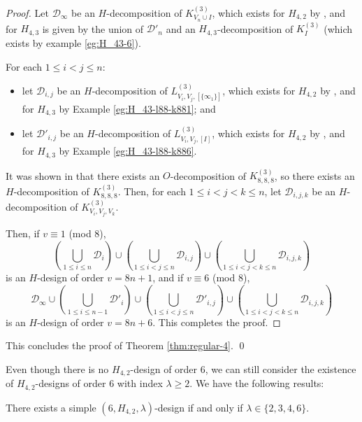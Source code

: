 \begin{proof}
Let $\mathcal{D}_\infty$ be an $H$-decomposition of $K_{V_n \cup I}^{(3)}$,
  which exists for $H_{4,2}$ by \cite{bryant}, and for $H_{4,3}$ is given by
  the union of $\mathcal{D}'_n$ and an $H_{4,3}$-decomposition of $K_{I}^{(3)}$ (which exists by example \ref{eg:H_43-6}).


For each $1 \leq i < j \leq n$:
\begin{itemize}
  \item let $\mathcal{D}_{i,j}$ be an $H$-decomposition of $L_{V_i,V_j,[\{\infty_1\}]}^{(3)}$, which exists for $H_{4,2}$ by \cite{bryant}, and for $H_{4,3}$ by Example \ref{eg:H_43-l88-k881}; and
  \item let $\mathcal{D}'_{i,j}$ be an $H$-decomposition of $L_{V_i,V_j,[I]}^{(3)}$, which exists for $H_{4,2}$ by \cite{bryant}, and for $H_{4,3}$ by Example \ref{eg:H_43-l88-k886}.
\end{itemize}

It was shown in \cite{hanani} that there exists an $O$-decomposition of $K_{8,8,8}^{(3)}$, so there exists an $H$-decomposition of $K_{8,8,8}^{(3)}$.
Then, for each $1 \leq i < j < k \leq n$, let $\mathcal{D}_{i,j,k}$ be an $H$-decomposition of $K_{V_i,V_j,V_k}^{(3)}$.

Then, if $v \equiv 1$ (mod 8),
\[
    \left( \bigcup_{1 \leq i \leq n} \mathcal{D}_i \right)
    \cup \left( \bigcup_{1 \leq i < j \leq n} \mathcal{D}_{i,j} \right)
    \cup \left( \bigcup_{1 \leq i < j < k \leq n} \mathcal{D}_{i,j,k} \right)
\]
is an $H$-design of order $v = 8n+1$, and if $v \equiv 6$ (mod 8),
\[
    \mathcal{D}_\infty \cup \left( \bigcup_{1 \leq i \leq n-1}
    \mathcal{D}'_i \right) \cup \left( \bigcup_{1 \leq i < j \leq n}
    \mathcal{D}'_{i,j} \right) \cup \left( \bigcup_{1
    \leq i < j < k \leq n} \mathcal{D}_{i,j,k} \right)
\]
is an $H$-design of order $v = 8n+6$. This completes the proof.
\end{proof}

This concludes the proof of Theorem \ref{thm:regular-4}. \qed

Even though there is no $H_{4,2}$-design of order $6$, we can still consider the existence of $H_{4,2}$-designs of order $6$ with index $\lambda \geq 2$.
We have the following results:

\begin{theorem} \label{thm:H_42-6-simple}
There exists a simple $(6, H_{4,2}, \lambda)$-design if and only if $\lambda \in \{2, 3, 4, 6\}$.
\end{theorem}


